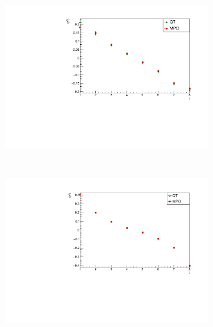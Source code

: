 \begin{figure}
    \centering
        \begin{subfigure}{\columnwidth}
        \centering
        \includegraphics[scale=0.5]{Figures/LMComparison_8sJ10505.pdf}
        \label{fig:LMComparison_8sJ10505}
        \end{subfigure}\\
        \begin{subfigure}{\columnwidth}
        \centering
        \includegraphics[scale=0.5]{Figures/LMComparison_8sJ1051.pdf}
        \label{fig:LMComparison_8sJ1051}
        \end{subfigure}\\
        \begin{subfigure}{\columnwidth}
        \centering

\end{subfigure}
\end{figure}
